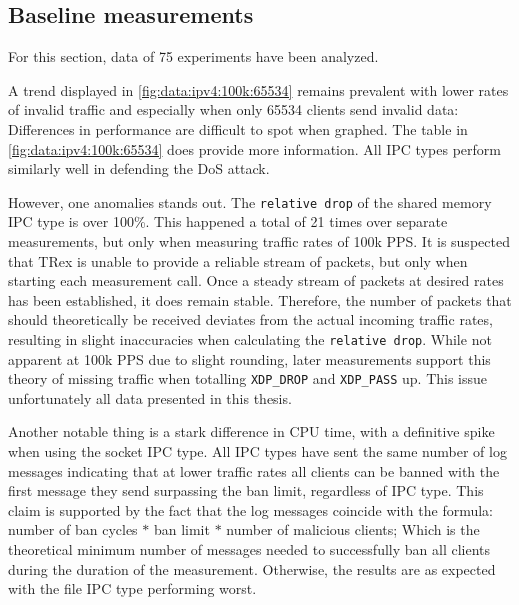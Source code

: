 \subsection{Baseline measurements}
For this section, data of 75 experiments have been analyzed.

A trend displayed in \ref{fig:data:ipv4:100k:65534} remains prevalent with lower rates of invalid traffic and especially when only 65534 clients send invalid data:
Differences in performance are difficult to spot when graphed.
The table in \ref{fig:data:ipv4:100k:65534} does provide more information.
All IPC types perform similarly well in defending the DoS attack.

However, one anomalies stands out.
The \texttt{relative drop} of the shared memory IPC type is over 100\%.
This happened a total of 21 times over separate measurements, but only when measuring traffic rates of 100k PPS.
It is suspected that TRex is unable to provide a reliable stream of packets, but only when starting each measurement call.
Once a steady stream of packets at desired rates has been established, it does remain stable.
Therefore, the number of packets that should theoretically be received deviates from the actual incoming traffic rates, resulting in slight inaccuracies when calculating the \texttt{relative drop}.
While not apparent at 100k PPS due to slight rounding, later measurements support this theory of missing traffic when totalling \texttt{XDP\_DROP} and \texttt{XDP\_PASS} up.
This issue unfortunately all data presented in this thesis.

Another notable thing is a stark difference in CPU time, with a definitive spike when using the socket IPC type.
All IPC types have sent the same number of log messages indicating that at lower traffic rates all clients can be banned with the first message they send surpassing the ban limit, regardless of IPC type.
This claim is supported by the fact that the log messages coincide with the formula:
number of ban cycles $*$ ban limit $*$ number of malicious clients;
Which is the theoretical minimum number of messages needed to successfully ban all clients during the duration of the measurement. 
Otherwise, the results are as expected with the file IPC type performing worst.

